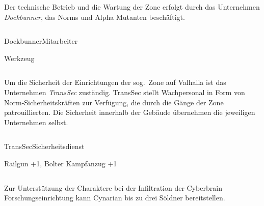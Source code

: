
\begin{column}[l]{0.45}
    Der technische Betrieb und die Wartung der Zone erfolgt durch das Unternehmen \emph{Dockbunner}, das Norms und Alpha Mutanten 
    beschäftigt.
\end{column}
\begin{column}[r]{0.45}
    \begin{nscsheet}[h]{Dockbunner\newline{}Mitarbeiter}
        \nscstats[]
        \nscruler
        \begin{nscinventory}
            \nscitem[Waffen] Werkzeug
        \end{nscinventory}
    \end{nscsheet}
\end{column}    


\begin{column}[l]{0.45}
    Um die Sicherheit der Einrichtungen der sog.~Zone auf Valhalla ist das Unternehmen \emph{TransSec} zuständig. TransSec stellt
    Wachpersonal in Form von Norm-Sicherheitskräften zur Verfügung, die durch die Gänge der Zone patrouillierten. Die Sicherheit
    innerhalb der Gebäude übernehmen die jeweiligen Unternehmen selbst.
\end{column}
\begin{column}[r]{0.45}
    \begin{nscsheet}[h]{TransSec\newline{}Sicherheitsdienst}
        \nscstats[ATT=2,AGG=2]
        \nscruler
        \begin{nscinventory}
            \nscitem[Waffen] Railgun +1, Bolter
            \nscitem[Rüstung] Kampfanzug +1
        \end{nscinventory}
    \end{nscsheet}
\end{column}
\vfill

\pagebreak
{}

Zur Unterstützung der Charaktere bei der Infiltration der Cyberbrain Forschungseinrichtung kann Cynarian bis zu 
drei Söldner bereitstellen.

